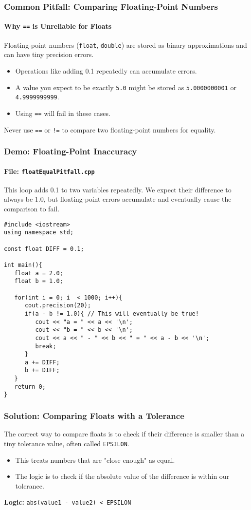 \documentclass{beamer}
\begin{document}
\begin{frame}
\frametitle{Common Pitfall: Comparing Floating-Point Numbers}
\framesubtitle{Why \texttt{==} is Unreliable for Floats}
Floating-point numbers (\texttt{float}, \texttt{double}) are stored as binary approximations and can have tiny precision errors.

\begin{itemize}
    \item Operations like adding 0.1 repeatedly can accumulate errors.
    \item A value you expect to be exactly \texttt{5.0} might be stored as \texttt{5.0000000001} or \texttt{4.9999999999}.
    \item Using \texttt{==} will fail in these cases.
\end{itemize}
\pause
\alert{Never use \texttt{==} or \texttt{!=} to compare two floating-point numbers for equality.}
\end{frame}

\begin{frame}[fragile]
\frametitle{Demo: Floating-Point Inaccuracy}
\framesubtitle{File: \texttt{floatEqualPitfall.cpp}}
This loop adds 0.1 to two variables repeatedly. We expect their difference to always be 1.0, but floating-point errors accumulate and eventually cause the comparison to fail.

\begin{verbatim}
#include <iostream>
using namespace std;

const float DIFF = 0.1;

int main(){
   float a = 2.0;
   float b = 1.0;

   for(int i = 0; i  < 1000; i++){
      cout.precision(20);
      if(a - b != 1.0){ // This will eventually be true!
         cout << "a = " << a << '\n';
         cout << "b = " << b << '\n';
         cout << a << " - " << b << " = " << a - b << '\n';
         break;
      }
      a += DIFF;
      b += DIFF;
   }
   return 0;
}
\end{verbatim}
\end{frame}

\begin{frame}
\frametitle{Solution: Comparing Floats with a Tolerance}
The correct way to compare floats is to check if their difference is smaller than a tiny tolerance value, often called \texttt{EPSILON}.

\begin{itemize}
    \item This treats numbers that are "close enough" as equal.
    \item The logic is to check if the \alert{absolute value} of the difference is within our tolerance.
\end{itemize}
\vfill
\begin{center}
    \textbf{Logic:} \texttt{abs(value1 - value2) < EPSILON}
\end{center}
\end{frame}
\end{document}
